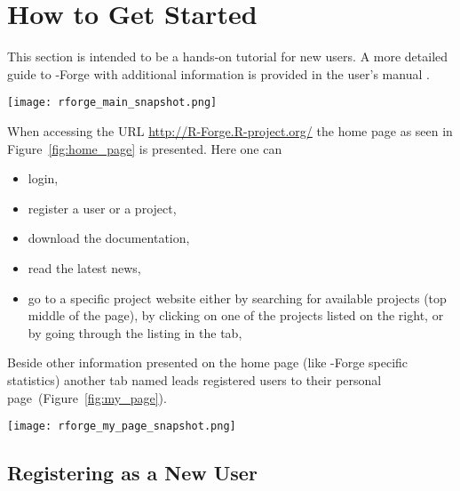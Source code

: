 \section{How to Get Started}
This section is intended to be a hands-on tutorial for new users. A
more detailed guide to \R{}-Forge with additional 
information is provided in the user's manual
\citep{forge:usermanual:2008}.

\begin{figure*}[th]
\centering
\texttt{[image: rforge\_main\_snapshot.png]}
\caption{Home page of \R{}-Forge}
\label{fig:home_page}
\end{figure*}

When accessing the URL \url{http://R-Forge.R-project.org/} the home
page as seen in Figure~\ref{fig:home_page} is presented. Here one can

\begin{itemize}
\item login,
\item register a user or a project,
\item download the documentation,
\item read the latest news,
\item go to a specific project website either by searching for available
  projects (top middle of the page), by clicking on one of the projects
  listed on the right, or by going through the listing in
  the  tab,
\end{itemize}

Beside other information presented on the home page (like \R{}-Forge
specific statistics) another tab named  leads registered
users to their personal page~(Figure~\ref{fig:my_page}).

\begin{figure*}[th]
\centering
\texttt{[image: rforge\_my\_page\_snapshot.png]}
\caption{A  tab of a registered user}
\label{fig:my_page}
\end{figure*}

\subsection{Registering as a New User}

